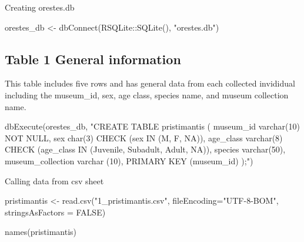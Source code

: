 \documentclass[
]{book}
\newenvironment{Shaded}{\begin{snugshade}}{\end{snugshade}}
\newcommand{\AttributeTok}[1]{\textcolor[rgb]{0.77,0.63,0.00}{#1}}
\newcommand{\ConstantTok}[1]{\textcolor[rgb]{0.00,0.00,0.00}{#1}}
\newcommand{\FunctionTok}[1]{\textcolor[rgb]{0.00,0.00,0.00}{#1}}
\newcommand{\NormalTok}[1]{#1}
\newcommand{\OtherTok}[1]{\textcolor[rgb]{0.56,0.35,0.01}{#1}}
\newcommand{\SpecialCharTok}[1]{\textcolor[rgb]{0.00,0.00,0.00}{#1}}
\newcommand{\StringTok}[1]{\textcolor[rgb]{0.31,0.60,0.02}{#1}}
\begin{document}
Creating orestes.db

\begin{Shaded}
\begin{Highlighting}[]
\NormalTok{orestes\_db }\OtherTok{\textless{}{-}} \FunctionTok{dbConnect}\NormalTok{(RSQLite}\SpecialCharTok{::}\FunctionTok{SQLite}\NormalTok{(), }\StringTok{"orestes.db"}\NormalTok{)}
\end{Highlighting}
\end{Shaded}

\hypertarget{table-1-general-information}{%
\subsection{Table 1 General information}\label{table-1-general-information}}

This table includes five rows and has general data from each collected invididual including the museum\_id, sex, age class, species name, and museum collection name.

\begin{Shaded}
\begin{Highlighting}[]
\FunctionTok{dbExecute}\NormalTok{(orestes\_db, }\StringTok{"CREATE TABLE pristimantis (}
\StringTok{museum\_id varchar(10) NOT NULL,}
\StringTok{sex char(3) CHECK (sex IN (\textquotesingle{}M\textquotesingle{}, \textquotesingle{}F\textquotesingle{}, \textquotesingle{}NA\textquotesingle{})),}
\StringTok{age\_class varchar(8) CHECK (age\_class IN (\textquotesingle{}Juvenile\textquotesingle{}, \textquotesingle{}Subadult\textquotesingle{}, \textquotesingle{}Adult\textquotesingle{}, \textquotesingle{}NA\textquotesingle{})),}
\StringTok{species varchar(50),}
\StringTok{museum\_collection varchar (10),}
\StringTok{PRIMARY KEY (museum\_id)}
\StringTok{);"}\NormalTok{)}
\end{Highlighting}
\end{Shaded}

Calling data from csv sheet

\begin{Shaded}
\begin{Highlighting}[]
\NormalTok{pristimantis }\OtherTok{\textless{}{-}} \FunctionTok{read.csv}\NormalTok{(}\StringTok{"1\_pristimantis.csv"}\NormalTok{, }\AttributeTok{fileEncoding=}\StringTok{"UTF{-}8{-}BOM"}\NormalTok{, }
                   \AttributeTok{stringsAsFactors =} \ConstantTok{FALSE}\NormalTok{) }

\FunctionTok{names}\NormalTok{(pristimantis)}
\end{Highlighting}
\end{Shaded}
\end{document}
